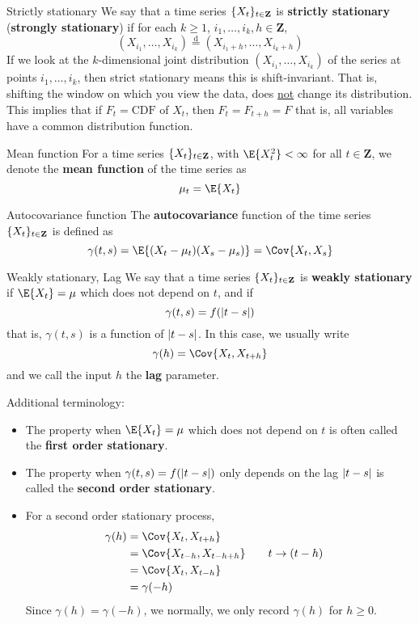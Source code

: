 \begin{Definition}{Strictly stationary}{}
    We say that a time series $ \{X_t\}_{t\in\mathbf{Z}} $
    is \textbf{strictly stationary} (\textbf{strongly stationary})
    if for each $ k\ge 1 $, $ i_1,\ldots,i_k,h\in\mathbf{Z} $,
    \[ (X_{i_1},\ldots,X_{i_k})\stackrel{\text{d}}{=}
        (X_{i_{1}+h},\ldots,X_{i_k+h}) \]
    {\color{blue}If we look at the $ k $-dimensional joint distribution
    $ (X_{i_1},\ldots,X_{i_k}) $
    of the series at points $ i_1,\ldots,i_k $, then
    strict stationary means this is shift-invariant.}
    That is, shifting the window on which
    you view the data, does \underline{not} change its distribution.
    This implies that if $ F_t=\text{CDF} $ of $ X_t $, then
    $ F_t=F_{t+h}=F $
    that is, all variables have a common distribution function.
\end{Definition}
\begin{Definition}{Mean function}{}
    For a time series $ \{X_t\}_{t\in\mathbf{Z}} $, with
    $ \E{X_t^2}<\infty $ for all $ t\in\mathbf{Z} $,
    we denote the \textbf{mean function} of the time series as
    \[ \mu_t=\E{X_t} \]
\end{Definition}
\begin{Definition}{Autocovariance function}{}
    The \textbf{autocovariance} function of the time series $ \{X_t\}_{t\in\mathbf{Z}} $
    is defined as
    \[ \gamma(t,s)=\E{(X_t-\mu_t)(X_s-\mu_s)}=\Cov{X_t,X_s} \]
\end{Definition}
\begin{Definition}{Weakly stationary, Lag}{}
    We say that a time series $ \{X_t\}_{t\in\mathbf{Z}} $
    is \textbf{weakly stationary} if $ \E{X_t}=\mu $
    which does not depend on $ t $, and if
    \[ \gamma(t,s)=f(\lvert t-s\rvert) \]
    that is, $ \gamma(t,s) $ is a function of $ \lvert t-s\rvert $. In this case,
    we usually write
    \[ \gamma(h)=\Cov{X_t,X_{t+h}} \]
    and we call the input $ h $ the \textbf{lag} parameter.
\end{Definition}
Additional terminology:
\begin{itemize}
    \item The property when $ \E{X_t}=\mu $ which does not depend
          on $ t $ is often called the \textbf{first order stationary}.
    \item The property when $ \gamma(t,s)=f(\lvert t-s\rvert) $
          only depends on the lag $ \lvert t-s\rvert $ is called the
          \textbf{second order stationary}.
    \item For a second order stationary process,
          \begin{align*}
              \gamma(h)
               & =\Cov{X_t,X_{t+h}}                                      \\
               & =\Cov{X_{t-h},X_{t-h+h}} & \quad & t\rightarrow{} (t-h) \\
               & =\Cov{X_t,X_{t-h}}                                      \\
               & =\gamma(-h)
          \end{align*}
          Since $ \gamma(h)=\gamma(-h) $, we
          normally, we only record $ \gamma(h) $ for $ h\ge 0 $.
\end{itemize}
